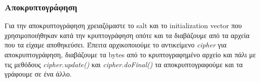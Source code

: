 \documentclass[a4paper]{article}
\begin{document}
\subsubsection{Αποκρυπτογράφηση}
Για την αποκρυπτογράφηση χρειαζόμαστε το salt και το initialization vector που
χρησιμοποιήθηκαν κατά την κρυπτογράφηση οπότε και τα διαβάζουμε από τα αρχεία
που τα είχαμε αποθηκεύσει. Έπειτα αρχικοποιούμε το αντικείμενο \emph{cipher} για
αποκρυπτογράφηση, διαβάζουμε τα bytes από το κρυπτογραφημένο αρχείο και πάλι με
τις μεθόδους \emph{cipher.update()} και \emph{cipher.doFinal()} τα
αποκρυπτογραφούμε και τα γράφουμε σε ένα άλλο.
\lstset{language=Java, numbers=left}

\end{document}
